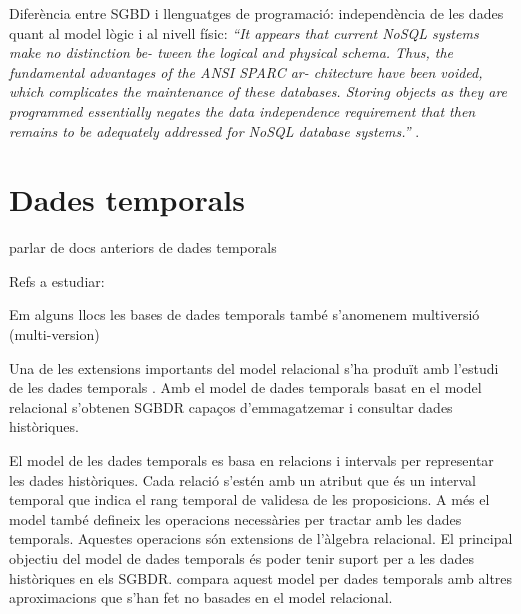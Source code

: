 \todo{}
Diferència entre SGBD i llenguatges de programació: independència de les dades quant al model lògic i al nivell físic: \emph{``It appears that
current NoSQL systems make no distinction be-
tween the logical and physical schema. Thus, the
fundamental advantages of the ANSI SPARC ar-
chitecture have been voided, which complicates the
maintenance of these databases. Storing objects as
they are programmed essentially negates the data
independence requirement that then remains to be
adequately addressed for NoSQL database systems.''}  \textcite{atzeni13:relational_model_dead}.








\section{Dades temporals}
\label{sec:art:dades_temporals}

parlar de docs anteriors de dades temporals

Refs a estudiar:

\cite{jensen99:temporaldata}
\cite{jensen00:thesis}
\cite{jensen98:temporal_database_glossary}
\cite{tansel93:temporal_databases}


Em alguns llocs les bases de dades temporals també s'anomenem multiversió (multi-version)


Una de les extensions importants del model relacional s'ha produït amb
l'estudi de les dades
temporals \parencite{date02:_tempor_data_relat_model}. Amb el model de
dades temporals basat en el model relacional s'obtenen SGBDR capaços
d'emmagatzemar i consultar dades històriques.

El model de les dades
temporals \parencite{date02:_tempor_data_relat_model} es basa en
relacions i intervals per representar les dades històriques. Cada
relació s'estén amb un atribut que és un interval temporal que indica
el rang temporal de validesa de les proposicions. A més el model també
defineix les operacions necessàries per tractar amb les dades
temporals. Aquestes operacions són extensions de l'àlgebra relacional.
El principal objectiu del model de dades temporals és poder tenir
suport per a les dades històriques en els SGBDR.
\textcite[cap.~28]{date06} compara aquest model per dades temporals
amb altres aproximacions que s'han fet no basades en el model
relacional.



